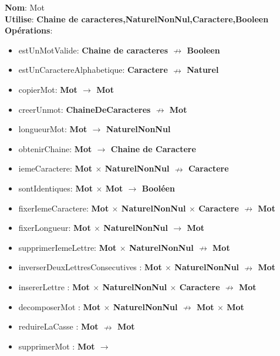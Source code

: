 \documentclass{article}
\begin{document}
    \noindent
    \textbf{Nom}: Mot \\
    \textbf{Utilise}: \textbf{Chaine de caracteres,NaturelNonNul,Caractere,Booleen} \\
    \textbf{Opérations}: \begin{itemize}[label=$\ $, leftmargin=2cm, itemsep=0cm]
        \item estUnMotValide: \textbf{Chaine de caracteres $\nrightarrow $ Booleen}
        \item estUnCaractereAlphabetique: \textbf{Caractere $\nrightarrow $ Naturel}
        \item copierMot: \textbf{Mot $\rightarrow $ Mot}
        \item creerUnmot: \textbf{ChaineDeCaracteres $ \nrightarrow$ Mot}
        \item longueurMot: \textbf{Mot $ \rightarrow$  NaturelNonNul}
        \item obtenirChaine: \textbf{Mot $\rightarrow $ Chaine de Caractere}
        \item iemeCaractere: \textbf{Mot $ \times $ NaturelNonNul $ \nrightarrow$  Caractere}
        \item sontIdentiques: \textbf{Mot $ \times $ Mot $ \rightarrow$  Booléen}
    	\item fixerIemeCaractere: \textbf{Mot $ \times $ NaturelNonNul $ \times $ Caractere $\nrightarrow$ Mot}
    	\item fixerLongueur: \textbf{Mot $ \times $ NaturelNonNul $\rightarrow$ Mot}
    	\item supprimerIemeLettre: \textbf{Mot $ \times $ NaturelNonNul $\nrightarrow$ Mot}
    	\item inverserDeuxLettresConsecutives : \textbf{Mot $\times$ NaturelNonNul $\nrightarrow$ Mot}
        \item insererLettre : \textbf{Mot $\times$ NaturelNonNul $ \times $ Caractere $\nrightarrow$ Mot}
        \item decomposerMot : \textbf{Mot $\times$ NaturelNonNul $\nrightarrow$ Mot $\times$ Mot}
        \item reduireLaCasse : \textbf{Mot $\nrightarrow$ Mot}
        \item supprimerMot : \textbf{Mot $\rightarrow $}
    \end{itemize}
    
\end{document}
